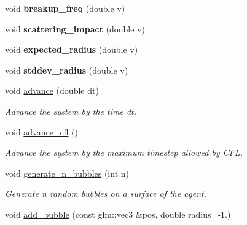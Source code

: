 \begin{DoxyCompactItemize}
\item 
\hypertarget{class_bubble_solver_a0c58fb3970d8863a8aea590ce0318933}{}void {\bfseries breakup\+\_\+freq} (double v)\label{class_bubble_solver_a0c58fb3970d8863a8aea590ce0318933}

\item 
\hypertarget{class_bubble_solver_a771994cbd671af14bb95feb9cfeede52}{}void {\bfseries scattering\+\_\+impact} (double v)\label{class_bubble_solver_a771994cbd671af14bb95feb9cfeede52}

\item 
\hypertarget{class_bubble_solver_ab8b0bb387045922636b27f52d009fa6c}{}void {\bfseries expected\+\_\+radius} (double v)\label{class_bubble_solver_ab8b0bb387045922636b27f52d009fa6c}

\item 
\hypertarget{class_bubble_solver_ae381b289f8f5823ff6286c704fe2cbae}{}void {\bfseries stddev\+\_\+radius} (double v)\label{class_bubble_solver_ae381b289f8f5823ff6286c704fe2cbae}

\item 
\hypertarget{class_bubble_solver_a158c006a1fc29d0332bf50a9a0c6325f}{}void \hyperlink{class_bubble_solver_a158c006a1fc29d0332bf50a9a0c6325f}{advance} (double dt)\label{class_bubble_solver_a158c006a1fc29d0332bf50a9a0c6325f}

\begin{DoxyCompactList}\small\item\em Advance the system by the time dt. \end{DoxyCompactList}\item 
\hypertarget{class_bubble_solver_a02793043b921099423f18ec306f4f8f0}{}void \hyperlink{class_bubble_solver_a02793043b921099423f18ec306f4f8f0}{advance\+\_\+cfl} ()\label{class_bubble_solver_a02793043b921099423f18ec306f4f8f0}

\begin{DoxyCompactList}\small\item\em Advance the system by the maximum timestep allowed by C\+F\+L. \end{DoxyCompactList}\item 
\hypertarget{class_bubble_solver_ad1d5b21ac34864e2056250790d597b72}{}void \hyperlink{class_bubble_solver_ad1d5b21ac34864e2056250790d597b72}{generate\+\_\+n\+\_\+bubbles} (int n)\label{class_bubble_solver_ad1d5b21ac34864e2056250790d597b72}

\begin{DoxyCompactList}\small\item\em Generate n random bubbles on a surface of the agent. \end{DoxyCompactList}\item 
\hypertarget{class_bubble_solver_a0864ddad3a6c432e37197bbfe94f03c0}{}void \hyperlink{class_bubble_solver_a0864ddad3a6c432e37197bbfe94f03c0}{add\+\_\+bubble} (const glm\+::vec3 \&pos, double radius=-\/1.)\label{class_bubble_solver_a0864ddad3a6c432e37197bbfe94f03c0}


\end{DoxyCompactItemize}
